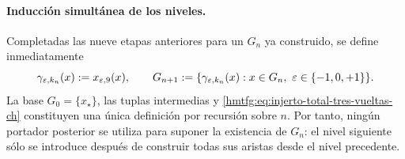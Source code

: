 \paragraph{Inducción simultánea de los niveles.}
Completadas las nueve etapas anteriores para un \(G_n\) ya construido,
se define inmediatamente
\begin{equation}
 \gamma_{\varepsilon,k_n}(x):=x_{\varepsilon,9}(x),\qquad
 G_{n+1}:=\{\gamma_{\varepsilon,k_n}(x):
       x\in G_n,\ \varepsilon\in\{-1,0,+1\}\}.
 \label{hmtfg:eq:injerto-total-tres-vueltas-ch}
\end{equation}
\label{hmtfg:eq:tres-vueltas-tpk-ch}
La base \(G_0=\{x_\star\}\), las tuplas intermedias y
\eqref{hmtfg:eq:injerto-total-tres-vueltas-ch} constituyen una única definición por
recursión sobre \(n\). Por tanto, ningún portador posterior se utiliza para
suponer la existencia de \(G_n\): el nivel siguiente sólo se introduce
después de construir todas sus aristas desde el nivel precedente.

